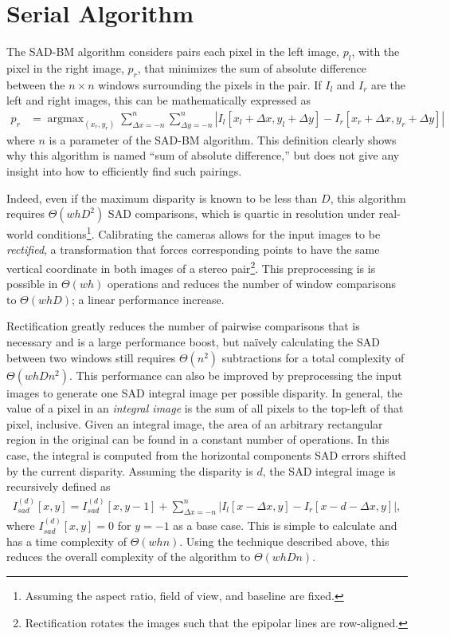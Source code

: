 \documentclass{article}
\newcommand{\abs}[1]{\left|#1\right|}
\DeclareMathOperator*{\argmin}{argmax}
\begin{document}
\section{Serial Algorithm}
\label{sec:serial}
The SAD-BM algorithm considers pairs each pixel in the left image, $p_l$, with
the pixel in the right image, $p_r$, that minimizes the sum of absolute
difference between the $n \times n$ windows surrounding the pixels in the pair.
If $I_l$ and $I_r$ are the left and right images, this can be mathematically
expressed as
\begin{align*}
    p_r &= \argmin_{(x_r, y_r)}
             \sum_{\Delta x = -n}^n \sum_{\Delta y = -n}^n \abs{
                 I_l[x_l + \Delta x, y_l + \Delta y]
               - I_r[x_r + \Delta x, y_r + \Delta y]
           }
\end{align*}
where $n$ is a parameter of the SAD-BM algorithm. This definition clearly shows
why this algorithm is named ``sum of absolute difference,'' but does not give
any insight into how to efficiently find such pairings.

Indeed, even if the maximum disparity is known to be less than $D$, this
algorithm requires $\Theta(whD^2)$ SAD comparisons, which is quartic in
resolution under real-world conditions\footnote{Assuming the aspect ratio,
field of view, and baseline are fixed.}. Calibrating the cameras allows for the
input images to be \textit{rectified}, a transformation that forces
corresponding points to have the same vertical coordinate in both images of a
stereo pair\footnote{Rectification rotates the images such that the epipolar
lines are row-aligned.}. This preprocessing is is possible in $\Theta(wh)$
operations and reduces the number of window comparisons to $\Theta(whD)$; a
linear performance increase.

Rectification greatly reduces the number of pairwise comparisons that is
necessary and is a large performance boost, but na\"{i}vely calculating the SAD
between two windows still requires $\Theta(n^2)$ subtractions for a total
complexity of $\Theta(whDn^2)$. This performance can also be improved by
preprocessing the input images to generate one SAD integral image per possible
disparity. In general, the value of a pixel in an \textit{integral image} is
the sum of all pixels to the top-left of that pixel, inclusive. Given an
integral image, the area of an arbitrary rectangular region in the original can
be found in a constant number of operations. In this case, the integral is
computed from the horizontal components SAD errors shifted by the current
disparity. Assuming the disparity is $d$, the SAD integral image is recursively
defined as
\begin{align*}
    I_{sad}^{(d)}[x, y] =
        I_{sad}^{(d)}[x, y - 1]
        + \sum_{\Delta x = -n}^n
          \abs{I_l[x - \Delta x, y] - I_r[x - d - \Delta x, y]},
\end{align*}
where $I_{sad}^{(d)}[x, y] = 0$ for $y = -1$ as a base case. This is simple to
calculate and has a time complexity of $\Theta(w h n)$. Using the technique
described above, this reduces the overall complexity of the algorithm to
$\Theta(whDn)$.
\end{document}
